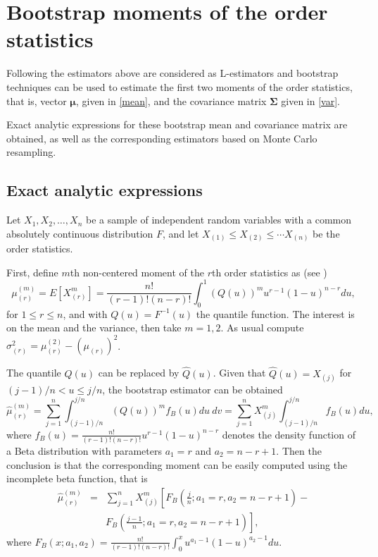 \documentclass[preprint,12pt]{elsarticle}
\begin{document}
\section{Bootstrap moments of the order statistics} \label{apx:moments}

Following \cite{HE2000}  the estimators above are considered as L-estimators  and  bootstrap techniques can be used to estimate the first two moments of the order statistics, that is, vector $\boldsymbol{\mu}$, given in \eqref{mean}, and the covariance matrix $\boldsymbol{\Sigma}$ given in \eqref{var}. 


Exact analytic expressions for these bootstrap mean and covariance matrix are obtained, as well as the corresponding estimators based on Monte Carlo resampling. 

\subsection{Exact analytic expressions}

Let $X_1,X_2,\ldots, X_n$ be a sample of independent random variables with a common absolutely continuous distribution $F$, and let  $X_{(1)} \leq X_{(2)}\leq \cdots X_{(n)}$ be the order statistics. 

First,  define $m$th non-centered moment of the $r$th order statistics as (see \cite{ABN08})
\begin{equation}\label{mu.r}
\mu_{(r)}^{(m)}=E\left[X_{(r)}^m\right]=\frac{n!}{(r-1)!(n-r)!}\int_0^1(Q(u))^m u^{r-1}(1-u)^{n-r}du,
\end{equation}
for $1\leq r \leq n$, and with $Q(u)=F^{-1}(u)$ the quantile function. The interest is on the mean and the variance, then take $m=1,2$. As usual compute $\sigma_{(r)}^2=\mu_{(r)}^{(2)}-\left(\mu_{(r)}\right)^2$.  
\vskip 0.5cm

The quantile $ Q(u)$ can be replaced by $\widehat{Q}(u)$. Given that $\widehat{Q}(u)= X_{(j)}$ for $(j-1)/n < u \leq j/n$,  the bootstrap estimator can be obtained
\begin{equation}\label{mu.hat}
\widehat{\mu}_{(r)}^{(m)}=\sum_{j=1}^n\int_{(j-1)/n}^{j/n}(Q(u))^m f_B(u)du \ dv=\sum_{j=1}^n X_{(j)}^m\int_{(j-1)/n}^{j/n} f_B(u)du,
\end{equation}
where $f_B(u)=\frac{n!}{(r-1)!(n-r)!} u^{r-1}(1-u)^{n-r}$ denotes the density function of a Beta distribution with parameters $a_1=r$ and $a_2=n-r+1$. Then the conclusion is that the corresponding moment can be easily computed using the incomplete beta function, that is
\begin{eqnarray*}%
\widehat{\mu}_{(r)}^{(m)}&=&\sum_{j=1}^n X_{(j)}^m\left[F_B\left(\frac{j}{n};a_1=r,a_2=n-r+1\right)- \right.\\
\qquad && \left. F_B\left(\frac{j-1}{n};a_1=r,a_2=n-r+1\right)\right],
\end{eqnarray*}
where $F_B(x;a_1,a_2)=\frac{n!}{(r-1)!(n-r)!}\int_0^x u^{a_1-1}(1-u)^{a_2-1} du$.
\end{document}

